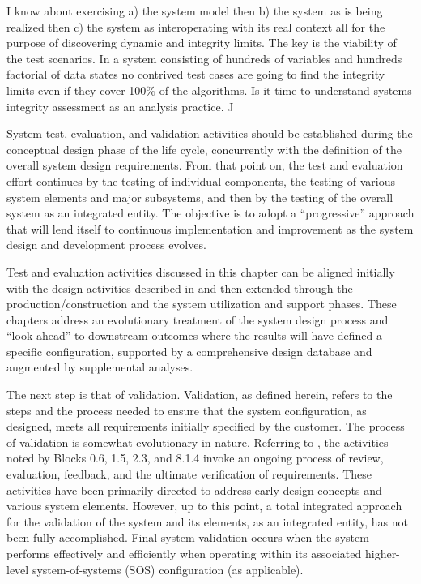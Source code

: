 I know about exercising a) the system model then b) the system as is being realized then c) the system as interoperating with its real context all for the purpose of discovering dynamic and integrity limits. The key is the viability of the test scenarios. In a system consisting of hundreds of variables and hundreds factorial of data states no contrived test cases are going to find the integrity limits even if they cover 100\% of the algorithms.
Is it time to understand systems integrity assessment as an analysis practice. J

System test, evaluation, and validation activities should be established during the conceptual design phase of the life cycle, concurrently with the definition of the overall system design requirements. From that point on, the test and evaluation effort continues by the testing of individual components, the testing of various system elements and major subsystems, and then by the testing of the overall system as an integrated entity. The objective is to adopt a ``progressive'' approach that will lend itself to continuous implementation and improvement as the system design and development process evolves.

Test and evaluation activities discussed in this chapter can be aligned initially with the design activities described in and then extended through the production/construction and the system utilization and support phases. These chapters address an evolutionary treatment of the system design process and ``look ahead'' to downstream outcomes where the results will have defined a specific configuration, supported by a comprehensive design database and augmented by supplemental analyses.

The next step is that of validation. Validation, as defined herein, refers to the steps and the process needed to ensure that the system configuration, as designed, meets all requirements initially specified by the customer. The process of validation is somewhat evolutionary in nature. Referring to , the activities noted by Blocks 0.6, 1.5, 2.3, and 8.1.4 invoke an ongoing process of review, evaluation, feedback, and the ultimate verification of requirements. These activities have been primarily directed to address early design concepts and various system elements. However, up to this point, a total integrated approach for the validation of the system and its elements, as an integrated entity, has not been fully accomplished. Final system validation occurs when the system performs effectively and efficiently when operating within its associated higher-level system-of-systems (SOS) configuration (as applicable).

